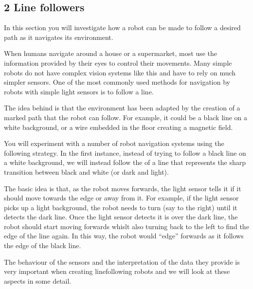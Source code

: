\documentclass[letterpaper,10pt,english]{sphinxmanual}
\begin{document}


\subsection{2 Line followers}
\label{\detokenize{content/04_Robot_Lab/Section_00_02:2-Line-followers}}\label{\detokenize{content/04_Robot_Lab/Section_00_02::doc}}
In this section you will investigate how a robot can be made to follow a desired path as it navigates its environment.

When humans navigate around a house or a supermarket, most use the information provided by their eyes to control their movements. Many simple robots do not have complex vision systems like this and have to rely on much simpler sensors. One of the most commonly used methods for navigation by robots with simple light sensors is to follow a line.

The idea behind  is that the environment has been adapted by the creation of a marked path that the robot can follow. For example, it could be a black line on a white background, or a wire embedded in the floor creating a magnetic field.

You will experiment with a number of robot navigation systems using the following strategy. In the first instance, instead of trying to follow a black line on a white background, we will instead follow the  of a line that represents the sharp transition between black and white (or dark and light).

The basic idea is that, as the robot moves forwards, the light sensor tells it if it should move towards the edge or away from it. For example, if the light sensor picks up a light background, the robot needs to turn (say to the right) until it detects the dark line. Once the light sensor detects it is over the dark line, the robot should start moving forwards whislt also turning back to the left to find the edge of the line again. In this way, the robot would “edge” forwards as it follows the
 edge of the black line.

The behaviour of the sensors and the interpretation of the data they provide is very important when creating line\sphinxhyphen{}following robots and we will look at these aspects in some detail.
\end{document}
